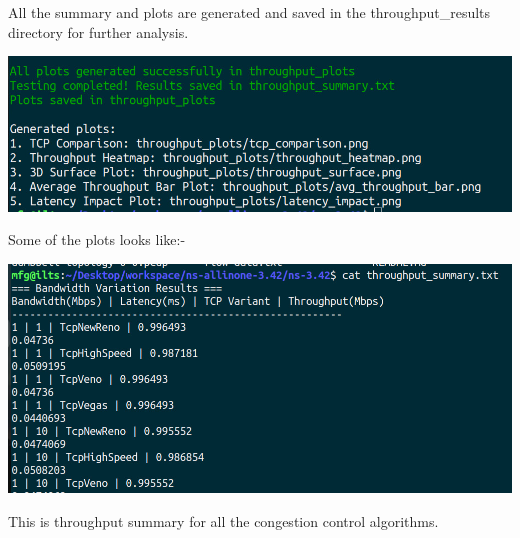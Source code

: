 \documentclass[11pt,a4paper]{article}
\begin{document}
All the summary and plots are generated and saved in the throughput\_results directory for further analysis.\\
\begin{center}
    \includegraphics[width=1\columnwidth]{images/plot-4.jpg}
\end{center}
Some of the plots looks like:-
\begin{center}
    \includegraphics[width=1\columnwidth]{images/result-4.jpg}
\end{center}
This is throughput summary for all the congestion control algorithms.\\
\normalsize
\end{document}
